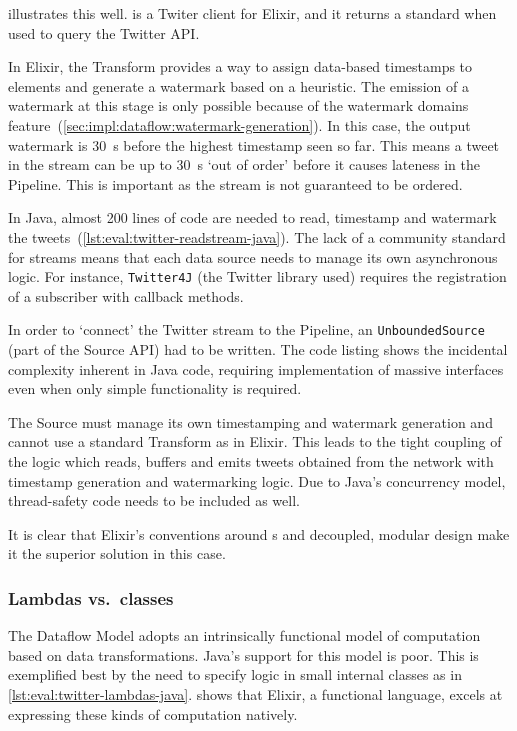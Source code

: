  illustrates this well.
 \cite{ExTwitter} is a Twiter client for Elixir, and it returns a standard  when used to query the Twitter API.

In Elixir, the  Transform provides a way to assign data-based timestamps to elements and generate a watermark based on a heuristic.
The emission of a watermark at this stage is only possible because of the watermark domains feature~(\cref{sec:impl:dataflow:watermark-generation}).
In this case, the output watermark is \SI{30}{\second} before the highest timestamp seen so far.
This means a tweet in the stream can be up to \SI{30}{\second} `out of order' before it causes lateness in the Pipeline.
This is important as the stream is not guaranteed to be ordered.

In Java, almost 200 lines of code are needed to read, timestamp and watermark the tweets~(\cref{lst:eval:twitter-readstream-java}).
The lack of a community standard for streams means that each data source needs to manage its own asynchronous logic.
For instance, \texttt{Twitter4J} \cite{Twitter4J} (the Twitter library used) requires the registration of a subscriber with callback methods.

In order to `connect' the Twitter stream to the Pipeline, an \texttt{UnboundedSource} (part of the Source API) had to be written.
The code listing shows the incidental complexity inherent in Java code, requiring implementation of massive interfaces even when only simple functionality is required.

The Source must manage its own timestamping and watermark generation and cannot use a standard Transform as in Elixir.
This leads to the tight coupling of the logic which reads, buffers and emits tweets obtained from the network with timestamp generation and watermarking logic.
Due to Java's concurrency model, thread-safety code needs to be included as well.

It is clear that Elixir's conventions around s and decoupled, modular design make it the superior solution in this case.

\subsubsection{Lambdas vs.\ classes}

The Dataflow Model adopts an intrinsically functional model of computation based on data transformations.
Java's support for this model is poor.
This is exemplified best by the need to specify logic in small internal classes as in \cref{lst:eval:twitter-lambdas-java}.
 shows that Elixir, a functional language, excels at expressing these kinds of computation natively.

